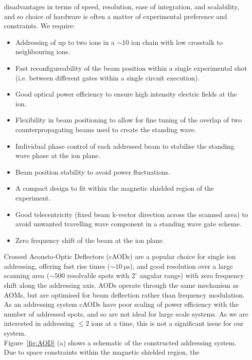     disadvantages in terms of speed, resolution, ease of integration, and
    scalability, and so choice of hardware is often a matter of experimental
    preference and constraints.
    We require:
    \begin{itemize}
        \item Addressing of up to two ions in a $\sim 10$ ion chain with low crosstalk to neighbouring ions.
        \item Fast reconfigureability of the beam position within a single experimental shot (i.e. between different gates within a single circuit execution).
        \item Good optical power efficiency to ensure high intensity electric fields at the ion. 
        \item Flexibility in beam positioning to allow for fine tuning of the overlap of two counterpropagating beams used to create the standing wave.
        \item Individual phase control of each addressed beam to stabilise the standing wave phase at the ion plane.
        \item Beam position stability to avoid power fluctuations.
        \item A compact design to fit within the magnetic shielded region of the experiment.
        \item Good telecentricity (fixed beam k-vector direction across the scanned area) to avoid unwanted travelling wave component in a standing wave gate scheme.
        \item Zero frequency shift of the beam at the ion plane.
    \end{itemize}
    Crossed Acousto-Optic Deflectors (cAODs) are a popular choice for single ion addressing, offering fast rise times ($\sim 10~\unit{\micro\second}$), and good resolution over a large scanning area ($\sim 500$ resolvable spots with $2^\circ$ angular range) with zero frequency shift along the addressing axis. AODs operate through the same mechanism as AOMs, but are optimised for beam deflection rather than frequency modulation. As an addressing system
    cAODs have poor scaling of power efficiency with the number of addressed spots, and so are not ideal for large scale systems. As we are interested in addressing $\leq 2$ ions at a time, this is not a significant issue for our system.\\
    Figure~\ref{fig:AOD} (a) shows a schematic of the constructed addressing
    system. Due to space constraints within the magnetic shielded region, the
